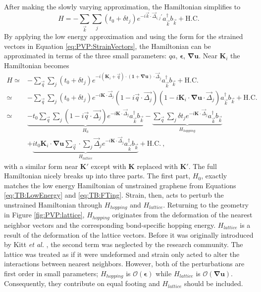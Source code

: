 After making the slowly varying approximation, the Hamiltonian simplifies to
\begin{equation*}
    H=-\sum_{\vec{k}} \sum_{j} \left( t_0+\delta t_j \right)
    e^{-i\vec{k}\cdot \vec{\Delta}_{i,j}'}
    a_{\vec{k}}^{\dagger} b_{\vec{k}} +\text{H.C.}
\end{equation*}
By applying the low energy approximation and using the form for the strained vectors in Equation \ref{eq:PVP:StrainVectors}, the Hamiltonian can be approximated in terms of the three small parameters: $qa$, $\bm{\epsilon}$, $\bm{\nabla u}$.
Near $\bm{K}_i$ the Hamiltonian becomes 
\begin{align*}
  H\simeq& -\sum_{\vec{q}} \sum_{j} \left( t_0+\delta t_j \right)
    e^{-i (\bm{K}_i+\vec{q}) \cdot (\bm{1}+\bm{\nabla u}) \cdot \vec{\Delta}_{j}}
    a_{\vec{k}}^{\dagger} b_{\vec{k}} +\text{H.C.} \\
   \simeq& -\sum_{\vec{q}} \sum_{j} \left( t_0+\delta t_j \right) e^{-i \bm{K} \cdot \vec{\Delta}_j}
    (1-i \vec{q} \cdot \vec{\Delta_j}) (1-i\bm{K}_i\cdot \bm{\nabla u} \cdot \vec{\Delta}_j)
    a_{\vec{k}}^{\dagger} b_{\vec{k}} +\text{H.C.} \\
   \simeq& 
    \underbrace{-t_0 \sum_{\vec{q}} \sum_{j} (1-i\vec{q} \cdot \vec{\Delta_j}) e^{-i \bm{K} \cdot \vec{\Delta}_j} a_{\vec{k}}^{\dagger}b_{\vec{k}}}_{H_0}
    -\underbrace{\sum_{\vec{q}} \sum_{j} \delta t_j e^{-i \bm{K} \cdot \vec{\Delta}_j} a_{\vec{k}}^{\dagger}b_{\vec{k}}}_{H_{hopping}} \\
    &+\underbrace{i t_0 \bm{K}_i \cdot \bm{\nabla u} \sum_{\vec{q}} \cdot \sum_{j} \vec{\Delta}_j e^{-i \bm{K} \cdot \vec{\Delta}_j} a_{\vec{k}}^{\dagger}b_{\vec{k}}}_{H_{lattice}}
    +\text{H.C.} \ ,
\end{align*}
with a similar form near $\bm{K'}$ except with $\bm{K}$ replaced with $\bm{K'}$.
The full Hamiltonian nicely breaks up into three parts.
The first part, $H_0$, exactly matches the low energy Hamiltonian of unstrained graphene from Equations \ref{eq:TB:LowEnergy} and \ref{eq:TB:FTing}.
Strain, then, acts to perturb the unstrained Hamiltonian through $H_{hopping}$ and $H_{lattice}$.
Returning to the geometry in Figure \ref{fig:PVP:lattice}, $H_{hopping}$ originates from the deformation of the nearest neighbor vectors and the corresponding bond-specific hopping energy.
$H_{lattice}$ is a result of the deformation of the lattice vectors.
Before it was originally introduced by Kitt \textit{et al.} \cite{Kitt2012}, the second term was neglected by the research community.
The lattice was treated as if it were undeformed and strain only acted to alter the interactions between nearest neighbors.
However, both of the perturbations are first order in small parameters; $H_{hopping}$ is $\mathcal{O}(\bm{\epsilon})$ while $H_{lattice}$ is $\mathcal{O}(\bm{\nabla u})$.
Consequently, they contribute on equal footing and $H_{lattice}$ should be included.

